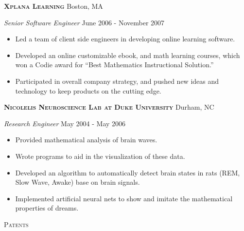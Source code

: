 \documentclass[a4paper]{article}
\newcommand{\lineunder} {
    \vspace*{-8pt} \\
    \hspace*{-18pt} \hrulefill \\
}
\newcommand{\header} [1] {
    {\hspace*{-18pt}\vspace*{6pt} \textsc{#1}}
    \vspace*{-6pt} \lineunder
    \vspace{2mm}
}
\begin{document}
\textbf{\textsc{Xplana Learning}} \hfill Boston, MA\\
\vspace{2mm}

\begin{addmargin}[1em]{0em}

\textit{Senior Software Engineer} \hfill June 2006 - November 2007\\
\vspace{-1mm}
\begin{itemize} \itemsep 1pt
    \item Led a team of client side engineers in developing online learning software.
    \item Developed an online customizable ebook, and math learning courses, which 
        won a Codie award for ``Best Mathematics Instructional Solution.''
    \item Participated in overall company strategy, and pushed new ideas and technology 
        to keep products on the cutting edge.
\end{itemize}

\end{addmargin}

\textbf{\textsc{Nicolelis Neuroscience Lab at Duke University}} \hfill Durham, NC\\
\vspace{2mm}

\begin{addmargin}[1em]{0em}

\textit{Research Engineer} \hfill May 2004 - May 2006\\
\vspace{-1mm}
\begin{itemize} \itemsep 1pt
    \item Provided mathematical analysis of brain waves.
    \item Wrote programs to aid in the visualization of these data.
    \item Developed an algorithm to automatically detect brain states 
        in rats (REM, Slow Wave, Awake) base on brain signals.
    \item Implemented artificial neural nets to show and imitate the 
        mathematical properties of dreams.

\end{itemize}

\end{addmargin}

\header{Patents}
\end{document}
